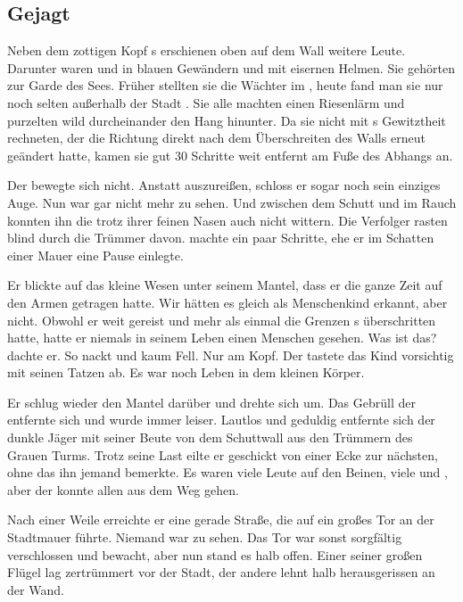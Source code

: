 \begin{huge}
\section{Gejagt}
Neben dem zottigen Kopf {\Pato}s erschienen oben auf dem Wall weitere Leute. Darunter waren {\Bangiri} und {\Enlander} in blauen Gewändern und mit eisernen Helmen. Sie gehörten zur Garde des Sees. Früher stellten sie die Wächter im {\Enland}, heute fand man sie nur noch selten außerhalb der Stadt {\Tern}. Sie alle machten einen Riesenlärm und purzelten wild durcheinander den Hang hinunter. Da sie nicht mit {\Eno}s Gewitztheit rechneten, der die Richtung direkt nach dem Überschreiten des Walls erneut geändert hatte, kamen sie gut 30 Schritte weit entfernt am Fuße des Abhangs an.

Der {\Schattenlaufer} bewegte sich nicht. Anstatt auszureißen, schloss er sogar noch sein einziges Auge. Nun war gar nicht mehr zu sehen. Und zwischen dem Schutt und im Rauch konnten ihn die {\Bangiri} trotz ihrer feinen Nasen auch nicht wittern. Die Verfolger rasten blind durch die Trümmer davon. {\Eno} machte ein paar Schritte, ehe er im Schatten einer Mauer eine Pause einlegte. 

Er blickte auf das kleine Wesen unter seinem Mantel, dass er die ganze Zeit auf den Armen getragen hatte. Wir hätten es gleich als Menschenkind erkannt, aber {\Eno} nicht. Obwohl er weit gereist und mehr als einmal die Grenzen {\Rhingell}s überschritten hatte, hatte er niemals in seinem Leben einen Menschen gesehen. Was ist das? dachte er. So nackt und kaum Fell. Nur am Kopf. Der {\Schattenlaufer} tastete das Kind vorsichtig mit seinen Tatzen ab. Es war noch Leben in dem kleinen Körper. 

Er schlug wieder den Mantel darüber und drehte sich um. Das Gebrüll der {\Bangiri} entfernte sich und wurde immer leiser. Lautlos und geduldig entfernte sich der dunkle Jäger mit seiner Beute von dem Schuttwall aus den Trümmern des Grauen Turms. Trotz seine Last eilte er geschickt von einer Ecke zur nächsten, ohne das ihn jemand bemerkte. Es waren viele Leute auf den Beinen, viele {\Enlander} und {\Bangiri}, aber der {\Schattenlaufer} konnte allen aus dem Weg gehen.

Nach einer Weile erreichte er eine gerade Straße, die auf ein großes Tor an der Stadtmauer führte. Niemand war zu sehen. Das Tor war sonst sorgfältig verschlossen und bewacht, aber nun stand es halb offen. Einer seiner großen Flügel lag zertrümmert vor der Stadt, der andere lehnt halb herausgerissen an der Wand. 


\end{huge}
